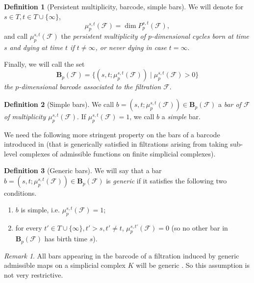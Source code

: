 \documentclass[11pt]{amsart}
\theoremstyle{theorem}
\theoremstyle{remark}
\newtheorem{remark}{Remark}[section]
\theoremstyle{definition}
\newtheorem{definition}{Definition}[section]
\begin{document}
\begin{definition}[Persistent multiplicity, barcode, simple bars]
\label{def:barcode2}
We will denote for $s \in T,  t \in T \cup \{\infty \}$,
\begin{equation}
\label{eqn:def:barcode:multiplicity}
\mu^{s,t}_p(\mathcal{F}) = \dim P^{s,t}_p(\mathcal{F}),
\end{equation}
and call $\mu^{s,t}_p(\mathcal{F})$ the \emph{persistent multiplicity of $p$-dimensional cycles born at time $s$ and dying at time $t$ if $t \neq \infty$,   or never dying in case $t = \infty$}.


Finally, we will call the set
\[
\mathbf{B}_p(\mathcal{F}) = \{(s,t;\mu^{s,t}_p(\mathcal{F})) \mid \mu^{s,t}_p(\mathcal{F}) > 0\}
\]
\emph{the $p$-dimensional barcode associated to the filtration $\mathcal{F}$}. 
\end{definition}

\begin{definition}[Simple bars]
\label{def:simple}
We call
$b = (s,t;\mu^{s,t}_p(\mathcal{F})) \in \mathbf{B}_p(\mathcal{F})$ a 
\emph{bar of $\mathcal{F}$ of multiplicity $\mu^{s,t}_p(\mathcal{F})$}. 
If $\mu^{s,t}_p(\mathcal{F})=1$, we  call $b$ a \emph{simple} bar.
\end{definition}

We need the following more stringent property on the bars of a barcode introduced in \cite{Basu-Cox} 
 (that is generically satisfied in 
filtrations arising from taking sub-level complexes of admissible functions
on finite simplicial complexes).

\begin{definition}[Generic bars] \cite{Basu-Cox}
\label{def:generic}
 We will say that a bar ${b} = (s,t;\mu^{s,t}_p(\mathcal{F})) \in \mathbf{B}_p(\mathcal{F})$ is \emph{generic} if it satisfies the following two conditions.
\begin{enumerate}
    \item  \label{itemlabel:generic:1}
    $b$ is simple, i.e. $\mu^{s,t}_p(\mathcal{F}) =1$;
    \item 
    \label{itemlabel:generic:2}
    for every $t' \in T \cup \{\infty\},  t' > s, t' \neq t$, $\mu^{s,t'}_p(\mathcal{F}) = 0$ (so no other bar in $\mathbf{B}_p(\mathcal{F})$ has birth time $s$).
\end{enumerate}
\end{definition}

\begin{remark}
    All bars appearing in the barcode of a filtration induced by generic admissible maps on a simplicial complex $K$ will be generic \cite{Basu-Cox}. So this assumption is not very restrictive.
\end{remark}
\end{document}
